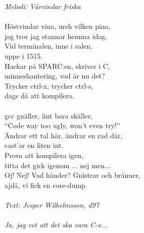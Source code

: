 {\footnotesize\textit{Melodi: Vårvindar friska}}\\
\\
Höstvindar vina, ursh vilken pina,\\
jag tror jag stannar hemma idag.\\
Vid terminalen, inne i salen,\\
uppe i 1515.\\
Hackar på SPARC:en, skriver i C,\\
minneshantering, vad är nu det?\\
Trycker ctrl-x, trycker ctrl-s,\\
dags då att kompilera.\\
\\
gcc gnäller, lint bara skäller,\\
“Code way too ugly, won’t even try!”\\
Ändrar ett tal här, ändrar en rad där,\\
cast’ar en liten int.\\
Prova att kompilera igen,\\
titta det gick igenom ... nej men...\\
Oj! Nej! Vad händer? Gnistrar och bränner,\\
ajdå, vi fick en core-dump.\\
\\
{\footnotesize\textit{Text: Jesper Wilhelmsson, d97\\ \\ Ja, jag vet
    att det ska vara C-x...}}
